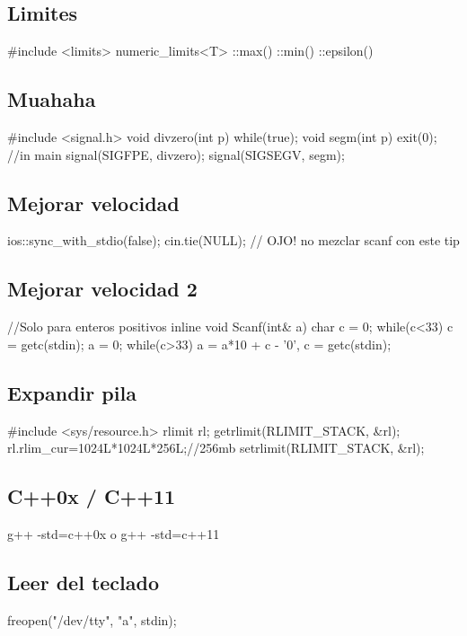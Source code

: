 \subsection*{Limites}
\begin{code}
#include <limits>
numeric_limits<T>
	::max()
	::min()
	::epsilon()
\end{code}
\subsection*{Muahaha}
\begin{code}
#include <signal.h>
void divzero(int p){
	while(true);}
void segm(int p){
	exit(0);}
//in main
signal(SIGFPE, divzero);
signal(SIGSEGV, segm);
\end{code}
\subsection*{Mejorar velocidad}
\begin{code}
ios::sync_with_stdio(false);
cin.tie(NULL); // OJO! no mezclar scanf con este tip
\end{code}
\subsection*{Mejorar velocidad 2}
\begin{code}
//Solo para enteros positivos
inline void Scanf(int& a){
	char c = 0;
	while(c<33) c = getc(stdin);
	a = 0;
	while(c>33)	a = a*10 + c - '0', c = getc(stdin);
}
\end{code}
\subsection*{Expandir pila}
\begin{code}
#include <sys/resource.h>
rlimit rl;
getrlimit(RLIMIT_STACK, &rl);
rl.rlim_cur=1024L*1024L*256L;//256mb
setrlimit(RLIMIT_STACK, &rl);
\end{code}
\subsection*{C++0x / C++11}
\begin{code}
g++ -std=c++0x o g++ -std=c++11
\end{code}
\subsection*{Leer del teclado}
\begin{code}
freopen("/dev/tty", "a", stdin);
\end{code}
